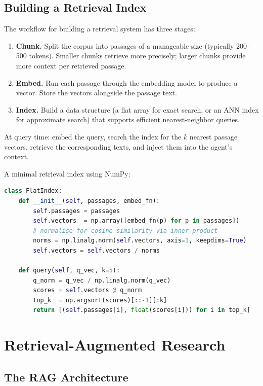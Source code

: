 \subsection{Building a Retrieval Index}

The workflow for building a retrieval system has three stages:
\begin{enumerate}
\item \textbf{Chunk.} Split the corpus into passages of a manageable size (typically 200--500 tokens).
Smaller chunks retrieve more precisely; larger chunks provide more context per retrieved passage.

\item \textbf{Embed.} Run each passage through the embedding model to produce a vector.
Store the vectors alongside the passage text.

\item \textbf{Index.} Build a data structure (a flat array for exact search, or an ANN index for approximate search) that supports efficient nearest-neighbor queries.
\end{enumerate}

At query time: embed the query, search the index for the $k$ nearest passage vectors, retrieve the corresponding texts, and inject them into the agent's context.

\begin{example}
A minimal retrieval index using NumPy:
\begin{lstlisting}[language=python]
class FlatIndex:
    def __init__(self, passages, embed_fn):
        self.passages = passages
        self.vectors  = np.array([embed_fn(p) for p in passages])
        # normalise for cosine similarity via inner product
        norms = np.linalg.norm(self.vectors, axis=1, keepdims=True)
        self.vectors = self.vectors / norms

    def query(self, q_vec, k=5):
        q_norm = q_vec / np.linalg.norm(q_vec)
        scores = self.vectors @ q_norm
        top_k  = np.argsort(scores)[::-1][:k]
        return [(self.passages[i], float(scores[i])) for i in top_k]
\end{lstlisting}
\end{example}

\section{Retrieval-Augmented Research}
\label{section:RAG}

\subsection{The RAG Architecture}

